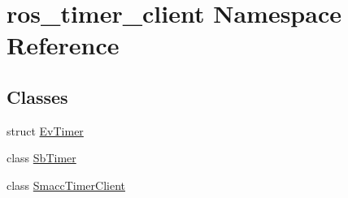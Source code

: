 \hypertarget{namespaceros__timer__client}{}\section{ros\+\_\+timer\+\_\+client Namespace Reference}
\label{namespaceros__timer__client}
\subsection*{Classes}
\begin{DoxyCompactItemize}
\item 
struct \hyperlink{structros__timer__client_1_1EvTimer}{Ev\+Timer}
\item 
class \hyperlink{classros__timer__client_1_1SbTimer}{Sb\+Timer}
\item 
class \hyperlink{classros__timer__client_1_1SmaccTimerClient}{Smacc\+Timer\+Client}
\end{DoxyCompactItemize}
